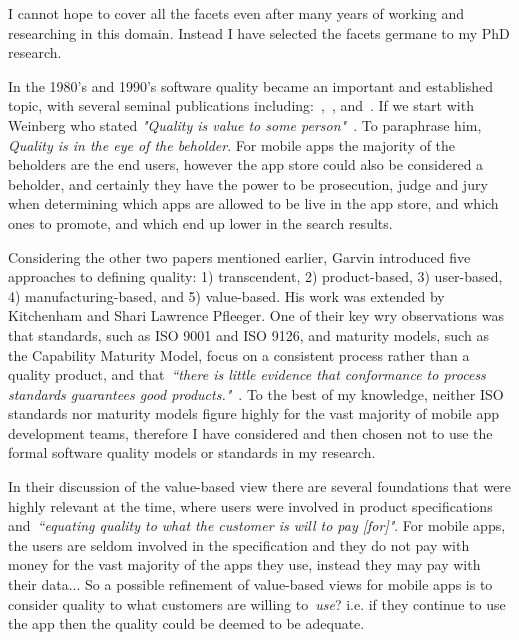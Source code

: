 I cannot hope to %
cover all the facets even after many years of working and researching in this domain. Instead I have selected the facets germane to my PhD research.

In the 1980's and 1990's software quality became an important and established topic, with several seminal publications including:~\citep{garvin1984_what_does_product_quality_really_mean},~\citep{weinberg1992quality}, and~\citep{kitchenham1996_software_quality_elusive_target}. If we start with Weinberg who stated \emph{"Quality is value to some person"}~\cite{weinberg1992quality}. To paraphrase him, \emph{Quality is in the eye of the beholder}. For mobile apps the majority of the beholders are the end users, however the app store could also be considered a beholder, and certainly they have the power to be prosecution, judge and jury when determining which apps are allowed to be live in the app store, and which ones to promote, and which end up lower in the search results.

Considering the other two papers mentioned earlier, Garvin introduced five approaches to defining quality: 1) transcendent, 2) product-based, 3) user-based, 4) manufacturing-based, and 5) value-based. His work was extended by Kitchenham and Shari Lawrence Pfleeger. One of their key wry observations was that standards, such as ISO 9001 and ISO 9126, and maturity models, such as the Capability Maturity Model, focus on a consistent process rather than a quality product, and that~\emph{``there is little evidence that conformance to process standards guarantees good products."}~\citep{kitchenham1996_software_quality_elusive_target}. To the best of my knowledge, neither ISO standards nor maturity models figure highly for the vast majority of mobile app development teams, therefore I have considered and then chosen not to use the formal software quality models or standards in my research. 

In their discussion of the value-based view there are several foundations that were highly relevant at the time, where users were involved in product specifications and~\emph{``equating quality to what the customer is will to pay [for]"}. For mobile apps, the users are seldom involved in the specification and they do not pay with money for the vast majority of the apps they use, instead they may pay with their data... So a possible refinement of value-based views for mobile apps is to consider quality to what customers are willing to~\emph{use}? i.e. if they continue to use the app then the quality could be deemed to be adequate.

